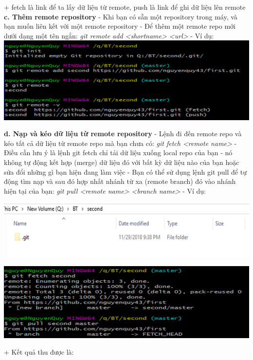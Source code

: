 \documentclass[12pt,a4paper]{report}
\begin{document}
	\label{fig:screenshot033}
\vskip 0.4cm\vskip 0.4cm
+ fetch là link để ta lấy dữ liệu từ remote, push là link để ghi dữ liệu lên remote\vskip 0.4cm
{\bf c. Thêm remote repository}\vskip 0.4cm
- Khi bạn có sẵn một repository trong máy, và bạn muốn liên kết với một remote repository\vskip 0.4cm
- Để thêm một remote repo mới dưới dạng một tên ngắn: {\it git remote add <shortname> <url>}\vskip 0.4cm
- Ví dụ: 
\vskip 0.4cm
	\includegraphics[width=0.8\linewidth]{screenshot034}
	
	\label{fig:screenshot034}
\vskip 0.4cm\vskip 0.4cm
{\bf d. Nạp và kéo dữ liệu từ remote repository} \vskip 0.4cm
- Lệnh đi đến remote repo và kéo tất cả dữ liệu từ remote repo mà bạn chưa có: {\it git fetch <remote name>}\vskip 0.4cm
- Điều cần lưu ý là lệnh git fetch chỉ tải dữ liệu xuống  local repo của bạn - nó không tự động kết hợp (merge) dữ liệu đó với bất kỳ dữ liệu nào của bạn hoặc sửa đổi những gì bạn hiện đang làm việc\vskip 0.4cm
- Bạn có thể sử dụng lệnh git pull để tự động tìm nạp và sau đó hợp nhất nhánh từ xa (remote branch) đó vào nhánh hiện tại của bạn: {\it git pull <remote name> <branch name>}\vskip 0.4cm
- Ví dụ: \vskip 0.4cm

	\includegraphics[width=0.8\linewidth]{screenshot035}

	\label{fig:screenshot035}

\vskip 0.4cm\vskip 0.4cm
	\includegraphics[width=0.8\linewidth]{screenshot036}

	\label{fig:screenshot036}
\vskip 0.4cm\vskip 0.4cm
+ Kết quả thu được là: \vskip 0.4cm
\end{document}
